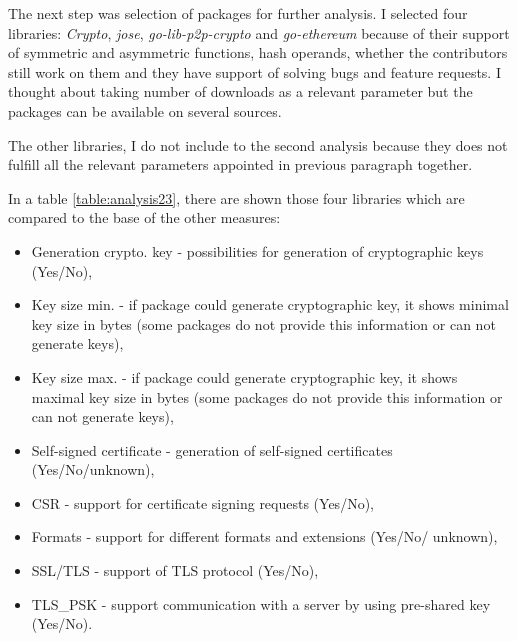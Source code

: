 \documentclass[
  12pt, 
  digital, %
  notable,   %
  nolof,     %
  nolot,     %
]{fithesis3}
\begin{document}
The next step was selection of packages for further analysis. I selected four libraries: 
\textit{Crypto}, \textit{jose}, \textit{go-lib-p2p-crypto} and \textit{go-ethereum} because of 
their support of symmetric and asymmetric functions, hash operands, whether the contributors still 
work on them and they have support of solving bugs and feature requests. I thought about taking 
number of downloads as a relevant parameter but the packages can be available on several sources. 

The other libraries, I do not include to the second analysis because they does not fulfill all the 
relevant parameters appointed in previous paragraph together.

In a table \ref{table:analysis23}, there are shown those four libraries which are compared to the 
base of the other measures:
\begin{itemize}[leftmargin=2em,rightmargin=1em,itemsep=0.75\parskip,parsep=0em,topsep=0em,partopsep=0em]
\item Generation crypto. key - possibilities for generation of cryptographic keys (Yes/No),
\item Key size min. - if package could generate cryptographic key, it shows minimal key size in bytes (some packages do not provide this information or can not generate keys),
\item Key size max. - if package could generate cryptographic key, it shows maximal key size in bytes (some packages do not provide this information or can not generate keys),
\item Self-signed certificate - generation of self-signed certificates (Yes/No/unknown),
\item CSR - support for certificate signing requests (Yes/No),
\item Formats - support for different formats and extensions (Yes/No/ unknown),
\item SSL/TLS - support of TLS protocol (Yes/No),
\item TLS\_PSK - support communication with a server by using pre-shared key (Yes/No).
\end{itemize}
\end{document}
